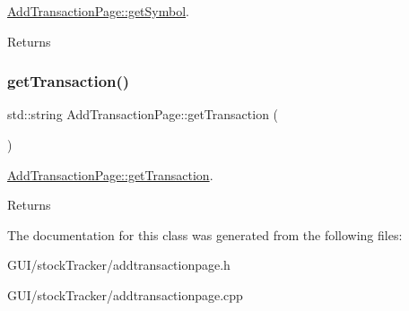 \mbox{\hyperlink{class_add_transaction_page_a6bbaa7bd372987922aa710c543f78668}{Add\+Transaction\+Page\+::get\+Symbol}}. 

\begin{DoxyReturn}{Returns}

\end{DoxyReturn}
\mbox{\label{class_add_transaction_page_a109f081b4117d9c7451ed7079598dddb}} 
\subsubsection{\texorpdfstring{get\+Transaction()}{getTransaction()}}
{\footnotesize\ttfamily std\+::string Add\+Transaction\+Page\+::get\+Transaction (\begin{DoxyParamCaption}{ }\end{DoxyParamCaption})}



\mbox{\hyperlink{class_add_transaction_page_a109f081b4117d9c7451ed7079598dddb}{Add\+Transaction\+Page\+::get\+Transaction}}. 

\begin{DoxyReturn}{Returns}

\end{DoxyReturn}


The documentation for this class was generated from the following files\+:\begin{DoxyCompactItemize}
\item 
G\+U\+I/stock\+Tracker/addtransactionpage.\+h\item 
G\+U\+I/stock\+Tracker/addtransactionpage.\+cpp\end{DoxyCompactItemize}
